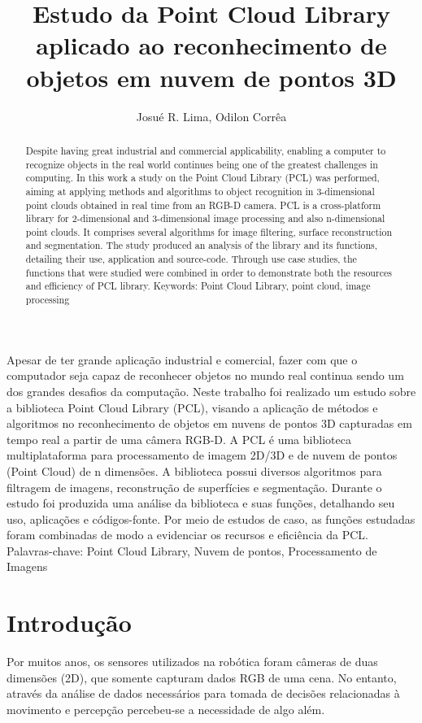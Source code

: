 \documentclass[12pt]{article}
\title{Estudo da Point Cloud Library aplicado ao reconhecimento de objetos em nuvem de pontos 3D}
\author{Josué R. Lima\inst{1}, Odilon Corrêa\inst{1}}
\begin{document}
 

\maketitle

\begin{abstract}
Despite having great industrial and commercial applicability, enabling a computer to recognize objects in the real world continues being one of the greatest challenges in computing. In this work a study on the Point Cloud Library (PCL) was performed, aiming at applying methods and algorithms to object recognition in 3-dimensional point clouds obtained in real time from an RGB-D camera. PCL is a  cross-platform library for 2-dimensional and 3-dimensional image processing and also n-dimensional point clouds. It comprises several algorithms for image filtering, surface reconstruction and segmentation. The study produced an analysis of the library and its functions, detailing their use, application and source-code. Through use case studies, the functions that were studied were combined in order to demonstrate both the resources and efficiency of PCL library.
Keywords: Point Cloud Library, point cloud, image processing
\end{abstract}
     
\begin{resumo} 

Apesar de ter grande aplicação industrial e comercial, fazer com que o computador seja capaz de
reconhecer objetos no mundo real continua sendo um dos grandes desafios da computação.
Neste trabalho foi realizado um estudo sobre a biblioteca Point Cloud Library (PCL), visando a
aplicação de métodos e algoritmos no reconhecimento de objetos em nuvens de pontos 3D
capturadas em tempo real a partir de uma câmera RGB-D. A PCL é uma biblioteca
multiplataforma para processamento de imagem 2D/3D e de nuvem de pontos (Point Cloud) de n
dimensões. A biblioteca possui diversos algoritmos para filtragem de imagens, reconstrução de
superfícies e segmentação. Durante o estudo foi produzida uma análise da biblioteca e suas funções,
detalhando seu uso, aplicações e códigos-fonte. Por meio de estudos de caso,
as funções estudadas foram combinadas de modo a evidenciar os recursos e eficiência da PCL.
Palavras-chave: Point Cloud Library, Nuvem de pontos, Processamento de Imagens
  		
\end{resumo}


\section{Introdução}
Por muitos anos, os sensores utilizados na robótica foram câmeras de duas dimensões (2D), que somente capturam dados RGB de uma cena. No entanto, através da análise de dados necessários para tomada de decisões relacionadas à movimento e percepção percebeu-se a necessidade de algo além.
\end{document}
